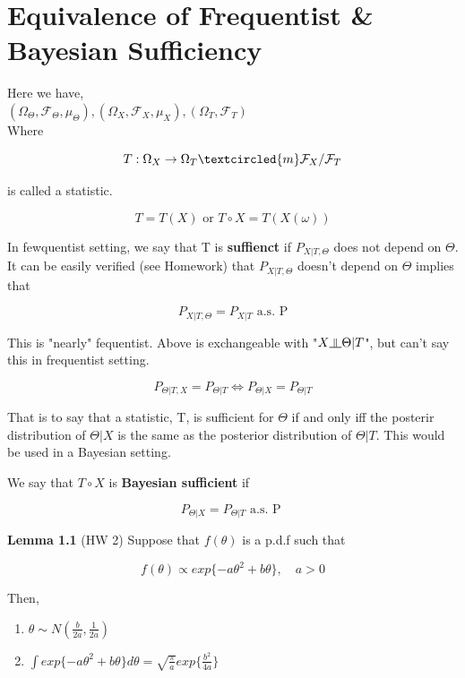 \documentclass[11pt,fleqn]{book} %
\newcommand{\indep}{\rotatebox[origin=c]{90}{$\models$}}
\begin{document}
\section{Equivalence of Frequentist \& Bayesian Sufficiency}


Here we have, \\

$(\Omega_\Theta, \mathcal{F}_\Theta, \mu_\Theta), (\Omega_X, \mathcal{F}_X, \mu_X),(\Omega_T, \mathcal{F}_T)$\\

Where 

		$$T: \Omega_X \rightarrow \Omega_T \textcircled{m} \mathcal{F}_X / \mathcal{F}_T $$

is called a statistic. 

		$$T = T(X) \text{ or } T \circ X = T(X(\omega)) $$

In fewquentist setting, we say that T is \textbf{suffienct} if $P_{X|T, \Theta}$ does not depend on $\Theta$. It can be easily verified (see Homework) that $P_{X|T, \Theta}$ doesn't depend on $\Theta$ implies that

		$$P_{X|T, \Theta} = P_{X|T} \text{ a.s. P} $$

This is "nearly" fequentist. Above is exchangeable with "$X \indep \Theta| T$", but can't say this in frequentist setting. 


		$$P_{\Theta | T, X}  =  P_{\Theta|T} \Leftrightarrow P_{\Theta|X} = P_{\Theta|T}$$

That is to say that a statistic, T, is sufficient for $\Theta$ if and only iff the posterir distribution of $\Theta|X$ is the same as the posterior distribution of $\Theta|T$. This would be used in a Bayesian setting. 

\begin{definition}
	We say that $T \circ X$ is \textbf{Bayesian sufficient} if 

			$$P_{\Theta | X}  =  P_{\Theta|T} \text{ a.s. P } $$
\end{definition}


\textbf{Lemma 1.1} (HW 2) Suppose that $f(\theta)$ is a p.d.f such that

		$$f(\theta) \propto exp\{-a\theta^2 + b\theta \}, \quad a > 0 $$

		Then, 

		\begin{enumerate}
			\item $\theta \sim N( \frac{b}{2a}, \frac{1}{2a})$
			\item $\int exp\{-a\theta^2 + b\theta \} d\theta =\sqrt{\frac{\pi}{a}} exp\{\frac{b^2}{4a} \} $
		\end{enumerate}
\end{document}
